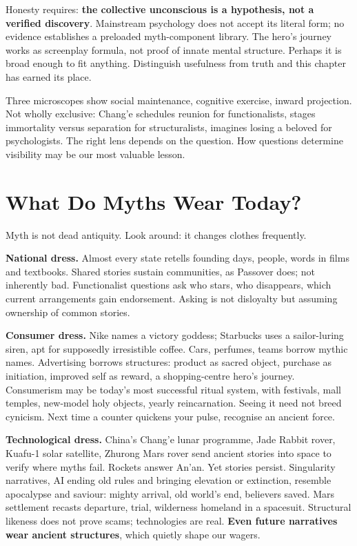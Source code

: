 Honesty requires: \textbf{the collective unconscious is a hypothesis, not a verified discovery}. Mainstream psychology does not accept its literal form; no evidence establishes a preloaded myth-component library. The hero's journey works as screenplay formula, not proof of innate mental structure. Perhaps it is broad enough to fit anything. Distinguish usefulness from truth and this chapter has earned its place.

Three microscopes show social maintenance, cognitive exercise, inward projection. Not wholly exclusive: Chang'e schedules reunion for functionalists, stages immortality versus separation for structuralists, imagines losing a beloved for psychologists. The right lens depends on the question. How questions determine visibility may be our most valuable lesson.

\section{What Do Myths Wear Today?}
Myth is not dead antiquity. Look around: it changes clothes frequently.

\textbf{National dress.} Almost every state retells founding days, people, words in films and textbooks. Shared stories sustain communities, as Passover does; not inherently bad. Functionalist questions ask who stars, who disappears, which current arrangements gain endorsement. Asking is not disloyalty but assuming ownership of common stories.

\textbf{Consumer dress.} Nike names a victory goddess; Starbucks uses a sailor-luring siren, apt for supposedly irresistible coffee. Cars, perfumes, teams borrow mythic names. Advertising borrows structures: product as sacred object, purchase as initiation, improved self as reward, a shopping-centre hero's journey. Consumerism may be today's most successful ritual system, with festivals, mall temples, new-model holy objects, yearly reincarnation. Seeing it need not breed cynicism. Next time a counter quickens your pulse, recognise an ancient force.

\textbf{Technological dress.} China's Chang'e lunar programme, Jade Rabbit rover, Kuafu-1 solar satellite, Zhurong Mars rover send ancient stories into space to verify where myths fail. Rockets answer An'an. Yet stories persist. Singularity narratives, AI ending old rules and bringing elevation or extinction, resemble apocalypse and saviour: mighty arrival, old world's end, believers saved. Mars settlement recasts departure, trial, wilderness homeland in a spacesuit. Structural likeness does not prove scams; technologies are real. \textbf{Even future narratives wear ancient structures}, which quietly shape our wagers.

